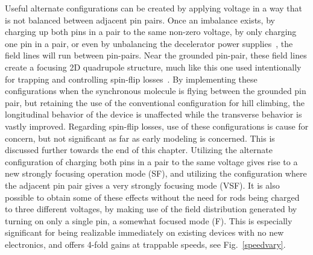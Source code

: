 Useful alternate configurations can be created by applying voltage in a way that is not balanced between adjacent pin pairs. 
Once an imbalance exists, by charging up both pins in a pair to the same non-zero voltage, by only charging one pin in a pair, or even by unbalancing the decelerator power supplies~\cite{Hoekstra2018}, the field lines will run between pin-pairs. 
Near the grounded pin-pair, these field lines create a focusing 2D quadrupole structure, much like this one used intentionally for trapping and controlling spin-flip losses~\cite{Reens2017}. 
By implementing these configurations when the synchronous molecule is flying between the grounded pin pair, but retaining the use of the conventional configuration for hill climbing, the longitudinal behavior of the device is unaffected while the transverse behavior is vastly improved.
Regarding spin-flip losses, use of these configurations is cause for concern, but not significant as far as early modeling is concerned. This is discussed further towards the end of this chapter.
Utilizing the alternate configuration of charging both pins in a pair to the same voltage gives rise to a new strongly focusing operation mode (SF), and utilizing the configuration where the adjacent pin pair gives a very strongly focusing mode (VSF). 
It is also possible to obtain some of these effects without the need for rods being charged to three different voltages, by making use of the field distribution generated by turning on only a single pin, a somewhat focused mode (F).
This is especially significant for being realizable immediately on existing devices with no new electronics, and offers 4-fold gains at trappable speeds, see Fig.~\ref{speedvary}. 

